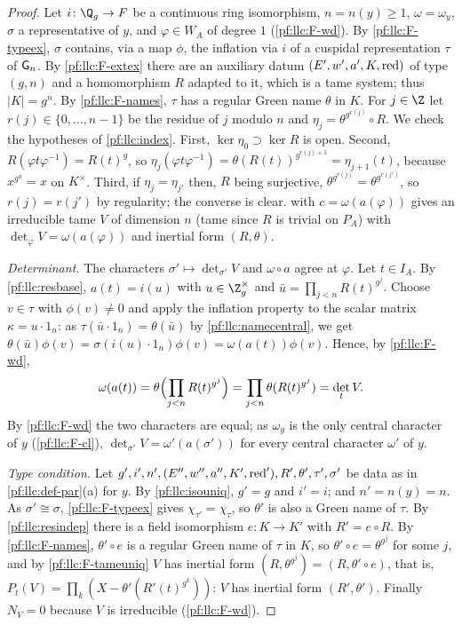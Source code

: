 \begin{proof}
Let $i\colon\Q_g\to F$ be a continuous ring isomorphism, $n=n(y)\ge1$, $\omega=\omega_y$, $\sigma$ a representative of
$y$, and $\varphi\in W_A$ of degree $1$ (\ref{pf:llc:F-wd}). By \ref{pf:llc:F-typeex}, $\sigma$ contains, via a map
$\phi$, the inflation via $i$ of a cuspidal representation $\tau$ of $\mathsf{G}_n$. By \ref{pf:llc:F-extex} there are an
auxiliary datum $(E',w',a',K,\operatorname{red})$ of type $(g,n)$ and a homomorphism $R$ adapted to it, which is a tame system;
thus $|K|=g^n$. By \ref{pf:llc:F-names}, $\tau$ has a regular Green name $\theta$ in $K$. For $j\in\Z$ let
$r(j)\in\{0,\dots,n-1\}$ be the residue of $j$ modulo $n$ and $\eta_j=\theta^{g^{r(j)}}\circ R$. We check the
hypotheses of \cref{pf:llc:index}. First, $\ker\eta_0\supset\ker R$ is open. Second, $R(\varphi t\varphi^{-1})=R(t)^g$, so
$\eta_j(\varphi t\varphi^{-1})=\theta(R(t))^{g^{r(j)+1}}=\eta_{j+1}(t)$, because $x^{g^n}=x$ on $K^\times$. Third, if
$\eta_j=\eta_{j'}$ then, $R$ being surjective, $\theta^{g^{r(j)}}=\theta^{g^{r(j')}}$, so $r(j)=r(j')$ by regularity;
the converse is clear.  with $c=\omega(a(\varphi))$ gives an irreducible tame $V$ of dimension
$n$ (tame since $R$ is trivial on $P_A$) with $\det_\varphi V=\omega(a(\varphi))$ and inertial form $(R,\theta)$.

\emph{Determinant.} The characters $\sigma'\mapsto\det_{\sigma'}V$ and $\omega\circ a$ agree at $\varphi$. Let $t\in I_A$. By
\cref{pf:llc:resbase}, $a(t)=i(u)$ with $u\in\Z_g^\times$ and $\bar u=\prod_{j<n}R(t)^{g^j}$. Choose $v\in\tau$ with
$\phi(v)\ne0$ and apply the inflation property to the scalar matrix $\kappa=u\cdot1_n$: as $\tau(\bar u\cdot1_n)=
\theta(\bar u)$ by \cref{pf:llc:namecentral}, we get $\theta(\bar u)\phi(v)=\sigma(i(u)\cdot1_n)\phi(v)=\omega(a(t))\phi(v)$.
Hence, by \ref{pf:llc:F-wd},
\[
  \omega(a(t))=\theta\Bigl(\prod_{j<n}R(t)^{g^j}\Bigr)=\prod_{j<n}\theta(R(t)^{g^j})=\det_tV .
\]
By \ref{pf:llc:F-wd} the two characters are equal; as $\omega_y$ is the only central character of $y$
(\ref{pf:llc:F-cl}), $\det_{\sigma'}V=\omega'(a(\sigma'))$ for every central character $\omega'$ of $y$.

\emph{Type condition.} Let $g',i',n',(E'',w'',a'',K',\operatorname{red}'),R',\theta',\tau',\sigma'$ be data as in
\cref{pf:llc:def-par}(a) for $y$. By \cref{pf:llc:isouniq}, $g'=g$ and $i'=i$; and $n'=n(y)=n$. As $\sigma'\cong\sigma$,
\ref{pf:llc:F-typeex} gives $\chi_{\tau'}=\chi_\tau$, so $\theta'$ is also a Green name of $\tau$. By
\cref{pf:llc:resindep} there is a field isomorphism $e\colon K\to K'$ with $R'=e\circ R$. By \ref{pf:llc:F-names},
$\theta'\circ e$ is a regular Green name of $\tau$ in $K$, so $\theta'\circ e=\theta^{g^j}$ for some $j$, and by
\ref{pf:llc:F-tameuniq} $V$ has inertial form $(R,\theta^{g^j})=(R,\theta'\circ e)$, that is,
$P_t(V)=\prod_k(X-\theta'(R'(t)^{g^k}))$: $V$ has inertial form $(R',\theta')$. Finally $N_V=0$ because $V$ is
irreducible (\ref{pf:llc:F-wd}).
\end{proof}

